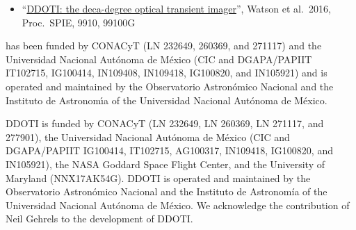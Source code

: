 \begin{itemize}
\item “\href{bibliography/spie-ddoti-2016.pdf}{DDOTI: the deca-degree optical transient imager}”, Watson et al.\ 2016, Proc.\ SPIE, 9910, 99100G
\end{itemize}

\fi

\ifcoatli
{\projectname} has been funded by CONACyT (LN 232649, 260369, and 271117)
and the Universidad Nacional Aut\'onoma de M\'exico (CIC and
DGAPA/PAPIIT IT102715, IG100414, IN109408, IN109418, IG100820, and IN105921) and is operated and
maintained by the Observatorio Astron\'omico Nacional and the Instituto
de Astronom{\'\i}a of the Universidad Nacional Aut\'onoma de M\'exico.
\fi

\ifddoti
DDOTI is funded by CONACyT (LN 232649, LN 260369, LN 271117, and 277901), the Universidad Nacional Autónoma de México (CIC and DGAPA/PAPIIT IG100414, IT102715, AG100317, IN109418, IG100820, and IN105921), the NASA Goddard Space Flight Center, and the University of Maryland (NNX17AK54G). DDOTI is operated and maintained by the Observatorio Astronómico Nacional and the Instituto de Astronomía of the Universidad Nacional Autónoma de México. We acknowledge the contribution of Neil Gehrels to the development of DDOTI.
\fi